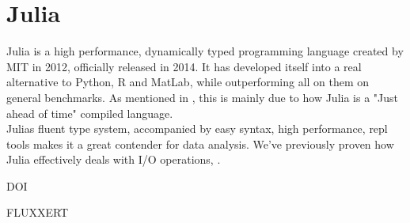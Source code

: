 \section{Julia}

Julia is a high performance, dynamically typed programming language created by MIT in 2012, officially released in 2014. It has developed itself into a real alternative to Python, R and MatLab, while outperforming all on them on general benchmarks. As mentioned in \cite{projthesis}, this is mainly due to how Julia is a "Just ahead of time" compiled language. \\ 

Julias fluent type system, accompanied by easy syntax, high performance, \acrshort{repl} tools makes it a great contender for data analysis. We've previously proven how Julia effectively deals with I/O operations, .


DOI \cite{doi:10.1137/141000671}

FLUXXERT